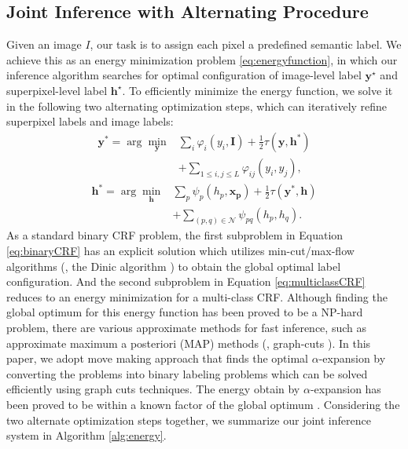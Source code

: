 \subsection{Joint Inference with Alternating Procedure}
\label{sec:inference}
Given an image $I$, our task is to assign each pixel a predefined semantic label.
We achieve this as an energy minimization problem \eqref{eq:energyfunction}, in which our inference algorithm searches for optimal configuration of image-level label $\boldsymbol{y}^\star$ and superpixel-level label $\boldsymbol{h}^\star$.
To efficiently minimize the energy function, we solve it in the following two alternating optimization steps, which can iteratively refine superpixel labels and image labels:
\begin{equation}
    \label{eq:binaryCRF}
    \begin{aligned}
        \boldsymbol{y}^* = \arg\min_{\boldsymbol{y}} &\sum_{i} {\varphi_{i}(y_i,\boldsymbol{I})} + \frac{1}{2} \tau(\boldsymbol{y},\boldsymbol{h}^*) \\ &+ \sum_{1 \le i,j \le L} {\varphi_{ij}(y_i,y_j)},
    \end{aligned}
\end{equation}
\begin{equation}
    \label{eq:multiclassCRF}
    \begin{aligned}
        \boldsymbol{h}^* = \arg\min_{\boldsymbol{h}} &\sum_{p} {\psi_{p}(h_p,\boldsymbol{x_p})} + \frac{1}{2} \tau(\boldsymbol{y}^*,\boldsymbol{h}) \\ &+ \sum_{(p,q) \in \mathcal{N}}{\psi_{pq}(h_p,h_q)}.
    \end{aligned}
\end{equation}
As a standard binary CRF problem, the first subproblem in Equation \eqref{eq:binaryCRF} has an explicit solution which utilizes min-cut/max-flow algorithms (\eg, the Dinic algorithm \cite{dinits1970algorithm}) to obtain the global optimal label configuration.
And the second subproblem in Equation \eqref{eq:multiclassCRF} reduces to an energy minimization for a multi-class CRF.
Although finding the global optimum for this energy function has been proved to be a NP-hard problem, there are various approximate methods for fast inference, such as approximate maximum a posteriori (MAP) methods (\eg, graph-cuts \cite{boykov2001fast}).
In this paper, we adopt move making approach \cite{boykov2001fast} that finds the optimal $\alpha$-expansion \cite{boykov2001fast,kolmogorov2004energy} by converting the problems into binary labeling  problems which can be solved efficiently using graph cuts techniques.
The energy obtain by $\alpha$-expansion has been proved to be within a known factor of the global optimum \cite{boykov2001fast}. Considering the two alternate optimization steps together, we summarize our joint inference system in Algorithm \ref{alg:energy}.


